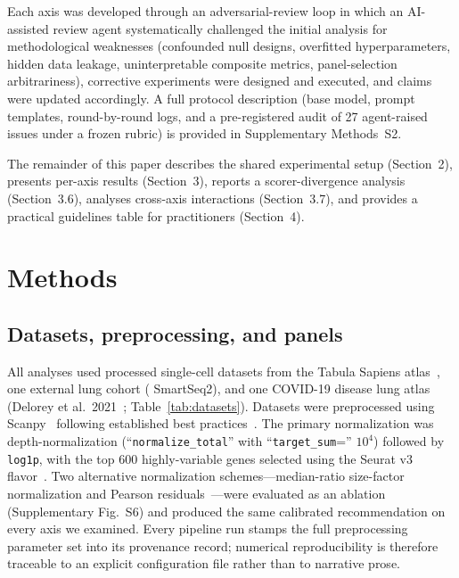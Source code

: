 \documentclass[unnumsec,webpdf,contemporary,large,namedate]{oup-authoring-template}
\begin{document}
Each axis was developed through an adversarial-review loop in which an
AI-assisted review agent systematically challenged the initial analysis for
methodological weaknesses (confounded null designs, overfitted
hyperparameters, hidden data leakage, uninterpretable composite metrics,
panel-selection arbitrariness), corrective experiments were designed and
executed, and claims were updated accordingly. A full protocol description
(base model, prompt templates, round-by-round logs, and a
pre-registered audit of 27 agent-raised issues under a frozen rubric)
is provided in Supplementary Methods~S2.

The remainder of this paper describes the shared experimental setup
(Section~2), presents per-axis results (Section~3), reports a
scorer-divergence analysis (Section~3.6), analyses cross-axis
interactions (Section~3.7), and provides a practical guidelines table
for practitioners (Section~4).

\section{Methods}

\subsection{Datasets, preprocessing, and panels}

All analyses used processed single-cell datasets from the Tabula
Sapiens atlas~\citep{TabulaSapiens2022}, one external lung cohort
(\citealt{Travaglini2020} SmartSeq2), and one COVID-19 disease lung
atlas (Delorey et al.\ 2021~\citep{Delorey2021}; Table~\ref{tab:datasets}).
Datasets were preprocessed using Scanpy~\citep{Wolf2018} following established
best practices~\citep{Luecken2019, Heumos2023}. The primary normalization was
depth-normalization (``\texttt{normalize\_total}'' with ``\texttt{target\_sum}='' $10^4$)
followed by \texttt{log1p}, with the top 600 highly-variable genes selected
using the Seurat v3 flavor~\citep{Stuart2019}. Two alternative normalization schemes---median-ratio
size-factor normalization and Pearson residuals~\citep{Lause2021}---were
evaluated as an ablation (Supplementary Fig.~S6) and produced the same
calibrated recommendation on every axis we examined. Every pipeline run
stamps the full preprocessing parameter set into its provenance record;
numerical reproducibility is therefore traceable to an explicit
configuration file rather than to narrative prose.
\end{document}
